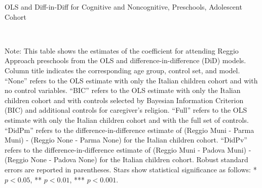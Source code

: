 \begin{table}[H] \caption{OLS and Diff-in-Diff for Cognitive and Noncognitive, Preschools, Adolescent Cohort} \label{ols-E-reg}
\scalebox{0.72}{}
\vspace{1ex} \\
\footnotesize\raggedright{Note: This table shows the estimates of the coefficient for attending Reggio Approach preschools from the OLS and difference-in-difference (DiD) models. Column title indicates the corresponding age group, control set, and model. ``None'' refers to the OLS estimate with only the Italian children cohort and with no control variables. ``BIC'' refers to the OLS estimate with only the Italian children cohort and with controls selected by Bayesian Information Criterion (BIC) and additional controls for caregiver's religion. ``Full'' refers to the OLS estimate with only the Italian children cohort and with the full set of controls. ``DidPm'' refers to the difference-in-difference estimate of (Reggio Muni - Parma Muni) - (Reggio None - Parma None) for the Italian children cohort. ``DidPv'' refers to the difference-in-difference estimate of (Reggio Muni - Padova Muni) - (Reggio None - Padova None) for the Italian children cohort.  Robust standard errors are reported in parentheses. Stars show statistical significance as follows: * $p < 0.05$, ** $p < 0.01$, *** $p < 0.001$.}
\end{table}



